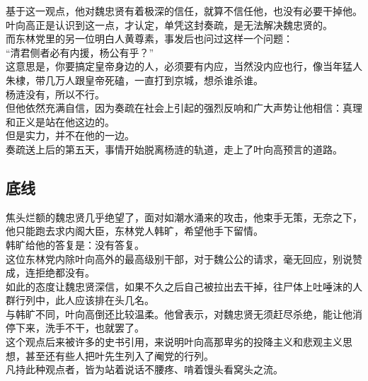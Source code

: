 \begin{multicols}{\theparacolNo}
基于这一观点，他对魏忠贤有着极深的信任，就算不信任他，也没有必要干掉他。\\

叶向高正是认识到这一点，才认定，单凭这封奏疏，是无法解决魏忠贤的。\\

而东林党里的另一位明白人黄尊素，事发后也问过这样一个问题：\\

“清君侧者必有内援，杨公有乎？”\\

这意思是，你要搞定皇帝身边的人，必须要有内应，当然没内应也行，像当年猛人朱棣，带几万人跟皇帝死磕，一直打到京城，想杀谁杀谁。\\

杨涟没有，所以不行。\\

但他依然充满自信，因为奏疏在社会上引起的强烈反响和广大声势让他相信：真理和正义是站在他这边的。\\

但是实力，并不在他的一边。\\

奏疏送上后的第五天，事情开始脱离杨涟的轨道，走上了叶向高预言的道路。\\

\subsection{底线}
焦头烂额的魏忠贤几乎绝望了，面对如潮水涌来的攻击，他束手无策，无奈之下，他只能跑去求内阁大臣，东林党人韩旷，希望他手下留情。\\

韩旷给他的答复是：没有答复。\\

这位东林党内除叶向高外的最高级别干部，对于魏公公的请求，毫无回应，别说赞成，连拒绝都没有。\\

如此的态度让魏忠贤深信，如果不久之后自己被拉出去干掉，往尸体上吐唾沫的人群行列中，此人应该排在头几名。\\

与韩旷不同，叶向高倒还比较温柔。他曾表示，对魏忠贤无须赶尽杀绝，能让他消停下来，洗手不干，也就罢了。\\

这个观点后来被许多的史书引用，来说明叶向高那卑劣的投降主义和悲观主义思想，甚至还有些人把叶先生列入了阉党的行列。\\

凡持此种观点者，皆为站着说话不腰疼、啃着馒头看窝头之流。\\


\end{multicols}
